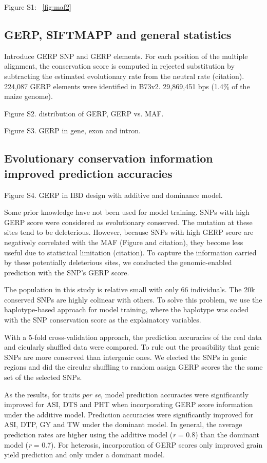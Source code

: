\documentclass[10pt]{article}
\begin{document}
Figure S1: ~\ref{fig:maf2}

\subsection*{GERP, SIFTMAPP and general statistics}

Introduce GERP SNP and GERP elements. For each position of the multiple alignment, the conservation score is computed in rejected substitution by subtracting the estimated evolutionary rate from the neutral rate (citation).
224,087 GERP elements were identified in B73v2. 
29,869,451 bps (1.4\% of the maize genome).


Figure S2. distribution of GERP, GERP vs. MAF.



Figure S3. GERP in gene, exon and intron.


\subsection*{Evolutionary conservation information improved prediction accuracies}

Figure S4. GERP in IBD design with additive and dominance model.

Some prior knowledge have not been used for model training. 
SNPs with high GERP score were considered as evolutionary conserved. The mutation at these sites tend to be deleterious. However, because SNPs with high GERP score are negatively correlated with the MAF (Figure and citation), they become less useful due to statistical limitation (citation). To capture the information carried by these potentially deleterious sites, we conducted the genomic-enabled prediction with the SNP's GERP score. 

The population in this study is relative small with only 66 individuals. The 20k conserved SNPs are highly colinear with others. To solve this problem, we use the haplotype-based approach for model training, where the haplotype was coded with the SNP conservation score as the explainatory variables. 

With a 5-fold cross-validation approach, the prediction accuracies of the real data and cicularly shuffled data were compared. To rule out the prossibility that genic SNPs are more conserved than intergenic ones. We elected the SNPs in genic regions and did the circular shuffling to random assign GERP scores the the same set of the selected SNPs.

As the results, for traits \emph{per se}, model prediction accuracies were significantly improved for ASI, DTS and PHT when incorporating GERP score information under the additive model. Prediction accuracies were significantly improved for ASI, DTP, GY and TW under the dominant model. In general, the average prediction rates are higher using the additive model (\emph{r} = 0.8) than the dominant model (\emph{r} = 0.7). For heterosis, incorporation of GERP scores only improved grain yield prediction and only under a dominant model.  
\end{document}
